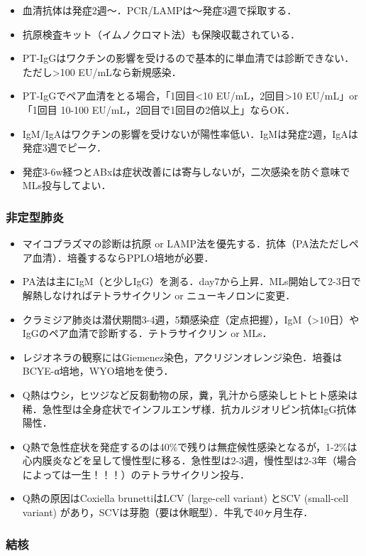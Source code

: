 \begin{itemize}
\item 血清抗体は発症2週〜．PCR/LAMPは〜発症3週で採取する．
\item 抗原検査キット（イムノクロマト法）も保険収載されている．
\item PT-IgGはワクチンの影響を受けるので基本的に単血清では診断できない．ただし>100 EU/mLなら新規感染．
\item PT-IgGでペア血清をとる場合，「1回目<10 EU/mL，2回目>10 EU/mL」or「1回目 10-100 EU/mL，2回目で1回目の2倍以上」ならOK．
\item IgM/IgAはワクチンの影響を受けないが陽性率低い．IgMは発症2週，IgAは発症3週でピーク．
\item 発症3-6w経つとABxは症状改善には寄与しないが，二次感染を防ぐ意味でMLs投与してよい．
\end{itemize}


\subsubsection{非定型肺炎}

\begin{itemize}
\item マイコプラズマの診断は抗原 or LAMP法を優先する．抗体（PA法ただしペア血清）．培養するならPPLO培地が必要．
\item PA法は主にIgM（と少しIgG）を測る．day7から上昇．MLs開始して2-3日で解熱しなければテトラサイクリン or ニューキノロンに変更．
\item クラミジア肺炎は潜伏期間3-4週，5類感染症（定点把握），IgM（>10日）やIgGのペア血清で診断する．テトラサイクリン or MLs．
\item レジオネラの観察にはGiemenez染色，アクリジンオレンジ染色．培養はBCYE-α培地，WYO培地を使う．
\item Q熱はウシ，ヒツジなど反芻動物の尿，糞，乳汁から感染しヒトヒト感染は稀．急性型は全身症状でインフルエンザ様．抗カルジオリピン抗体IgG抗体陽性．
\item Q熱で急性症状を発症するのは40\%で残りは無症候性感染となるが，1-2\%は心内膜炎などを呈して慢性型に移る．急性型は2-3週，慢性型は2-3年（場合によっては一生！！！）のテトラサイクリン投与．
\item Q熱の原因はCoxiella brunettiはLCV (large-cell variant) とSCV (small-cell variant) があり，SCVは芽胞（要は休眠型）．牛乳で40ヶ月生存．
\end{itemize}


\subsubsection{結核}

